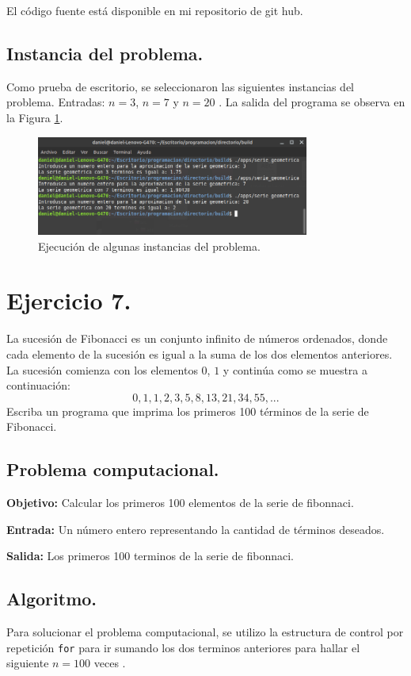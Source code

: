 \documentclass[12pt,letterpaper]{article}
\begin{document}
El código fuente está disponible en mi repositorio de git hub. \cite{url:serie_geometrica}

\subsection{Instancia del problema.}
Como prueba de escritorio, se seleccionaron las siguientes instancias del problema. Entradas: $n=3$, $n=7$ y $n=20$ . La salida del programa se observa en la Figura \ref{fig:serie_geometrica}.
\begin{figure}[ht!]
  \centering
  \includegraphics[width=0.8\textwidth]{figures/serie_geometrica}
  \caption{Ejecución de algunas instancias del problema.}
  \label{fig:serie_geometrica}
\end{figure}


\section{Ejercicio 7.}

La sucesi\'on de Fibonacci es un conjunto infinito de n\'umeros ordenados, donde cada elemento de la sucesi\'on es igual a la suma de los dos elementos anteriores. La sucesi\'on comienza con los elementos $0$, $1$ y contin\'ua como se muestra a continuaci\'on: 
$$ 0, 1, 1, 2, 3, 5, 8, 13, 21, 34, 55,... $$
Escriba un programa que imprima los primeros 100 t\'erminos de la serie de
Fibonacci.

\subsection{Problema computacional.}
\textbf{Objetivo:} Calcular los primeros 100 elementos de la serie de fibonnaci.

\textbf{Entrada:} Un n\'umero entero representando la cantidad de t\'erminos deseados.

\textbf{Salida:} Los primeros 100 terminos de la serie de fibonnaci.

\subsection{Algoritmo.}
Para solucionar el problema computacional, se utilizo la estructura de control por repetici\'on \texttt{for} para ir sumando los dos terminos anteriores para hallar el siguiente $n=100$ veces .
\end{document}
